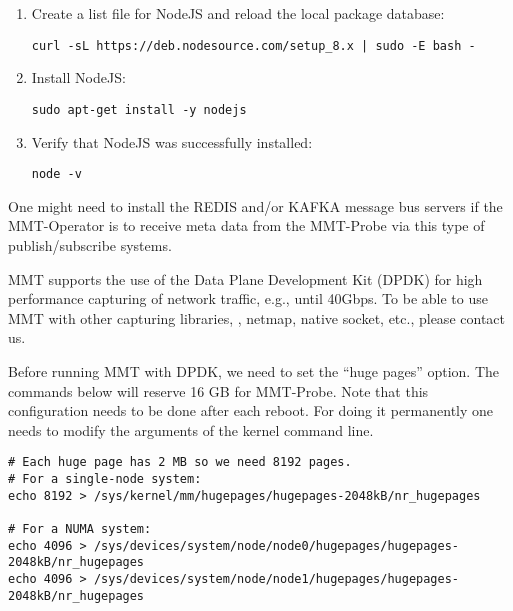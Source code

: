 \begin{enumerate}
    \item Create a list file for NodeJS and reload the local package database:
    
\begin{lstlisting}[style=BASH]
curl -sL https://deb.nodesource.com/setup_8.x | sudo -E bash -
\end{lstlisting}
    
    \item Install NodeJS:
    
\begin{lstlisting}[style=BASH]
sudo apt-get install -y nodejs
\end{lstlisting}
    
    \item Verify that NodeJS was successfully installed:
    
\begin{lstlisting}[style=BASH]
node -v
\end{lstlisting}
    
\end{enumerate}

 One might need to install the REDIS and/or KAFKA message bus servers if the MMT-Operator is to receive meta data from the MMT-Probe via this type of publish/subscribe systems.


MMT supports the use of the Data Plane Development Kit (DPDK) for high performance capturing of network traffic, e.g., until 40Gbps. To be able to use MMT with other capturing libraries, \eg, netmap, native socket, etc., please contact us.

Before running MMT with DPDK, we need to set the {\textquotedblleft}huge pages{\textquotedblright} option.
    The commands below will reserve 16 GB for MMT-Probe.
Note that this configuration needs to be done after each reboot. For doing it permanently one needs to modify the arguments of the kernel command line.
    
\begin{lstlisting}[style=BASH]
# Each huge page has 2 MB so we need 8192 pages.
# For a single-node system:
echo 8192 > /sys/kernel/mm/hugepages/hugepages-2048kB/nr_hugepages

# For a NUMA system:
echo 4096 > /sys/devices/system/node/node0/hugepages/hugepages-2048kB/nr_hugepages
echo 4096 > /sys/devices/system/node/node1/hugepages/hugepages-2048kB/nr_hugepages
\end{lstlisting}

